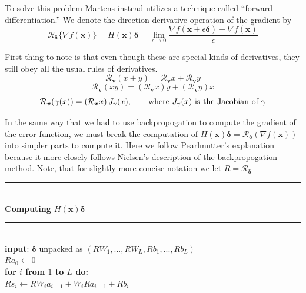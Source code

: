 \documentclass[]{article}
\newcommand{\B}[1]{\boldsymbol{#1}}
\newcommand{\Dv}[1]{\mathcal{R}_{\B{#1}}}
\newcommand{\pd}{\partial}
\newcommand{\tab}{\hspace*{.25in}}
\newcommand{\Hline}{\noindent\rule[0.5ex]{\linewidth}{.5pt}}
\theoremstyle{plain}
\theoremstyle{definition}
\newcommand{\algostart}[1]{\Hline\\\textbf{#1}\\\Hline\\}
\begin{document}
To solve this problem Martens instead utilizes a technique called ``forward differentiation.'' We denote the direction derivative operation of the gradient by
\[ \Dv{\delta} \{\nabla f(\B{x})\} = H(\B{x})\B{\delta} = \lim\limits_{\epsilon\to0}\frac{\nabla f(\B{x} + \epsilon\B{\delta}) - \nabla f(\B{x})}{\epsilon}\]

First thing to note is that even though these are special kinds of derivatives, they still obey all the usual rules of derivatives.
\[ \Dv{v}(x+y) = \Dv{v}x + \Dv{v}y \]
\[ \Dv{v}(xy) = \left(\Dv{v}x\right)y + \left(\Dv{v}y\right)x \]
\[ \Dv{v}(\gamma(x)) = \left(\Dv{v}x\right)J_\gamma(x),  \text{\qquad where $ J_\gamma(x) $ is the Jacobian of $ \gamma $}  \]

In the same way that we had to use backpropogation to compute the gradient of the error function, we must break the computation of $ H(\B{x})\B{\delta} = \Dv{\delta}\left(\nabla f(\B{x})\right) $ into simpler parts to compute it. Here we follow Pearlmutter's explanation because it more closely follows Nielsen's description of the backpropogation method. Note, that for slightly more concise notation we let $ R = \Dv{\delta} $  
%
%
%
\algostart{Computing $ H(\B{x})\B{\delta} $}
\textbf{input}: $ \B{\delta} $ unpacked as $ (RW_1, ..., RW_L, Rb_1, ... ,Rb_L) $\\
$ Ra_0\leftarrow 0 $\\
\textbf{for $ i $ from $ 1 $ to $ L $ do:}\\
\tab$ Rs_i \leftarrow RW_{i}a_{i-1} + W_iRa_{i-1} + Rb_i $\\
\end{document}
